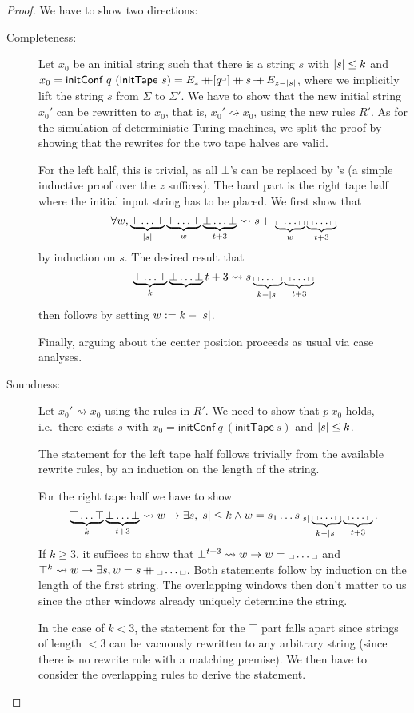 \documentclass[a4paper,UKenglish,cleveref, autoref]{lipics-v2019}
\newcommand{\strent}{\rightsquigarrow}
\begin{document}
\begin{proof}
  We have to show two directions:
  \begin{description}
  	\item[Completeness:]
      Let $x_0$ be an initial string such that there is a string $s$ with $|s| \le k$ and $x_0 = \textsf{initConf}~q~(\textsf{initTape}~s) = E_z \concat [q^\blank] \concat s \concat E_{z - \length{s}}$, where we implicitly lift the string $s$ from $\Sigma$ to $\Sigma'$. We have to show that the new initial string $x_0'$ can be rewritten to $x_0$, that is, $x_0' \strent{} x_0$, using the new rules $R'$. As for the simulation of deterministic Turing machines, we split the proof by showing that the rewrites for the two tape halves are valid.

      For the left half, this is trivial, as all $\bot$'s can be replaced by \blank's (a simple inductive proof over the $z$ suffices). The hard part is the right tape half where the initial input string has to be placed.
      We first show that 
      \[ \forall w, \underbrace{\top \ldots \top}_{\length{s}} \underbrace{\top \ldots \top}_{w} \underbrace{\bot \ldots \bot}_{t + 3} \strent{} s \concat \underbrace{\blank \ldots \blank}_{w} \underbrace{\blank \ldots \blank}_{t+3} \]
      by induction on $s$. The desired result that 
      \[\underbrace{\top \ldots \top}_{k} \underbrace{\bot \ldots \bot}{t+3} \strent{} s \underbrace{\blank \ldots \blank}_{k-\length{s}} \underbrace{\blank \ldots \blank}_{t+3} \]
      then follows by setting $w := k - |s|$. 

      Finally, arguing about the center position proceeds as usual via case analyses.

  	\item[Soundness:]
      Let $x_0' \strent{} x_0$ using the rules in $R'$. We need to show that $p~x_0$ holds, i.e.\ there exists $s$ with $x_0 = \textsf{initConf}~q~(\textsf{initTape}~s)$ and $|s| \le k$. 
      
      The statement for the left tape half follows trivially from the available rewrite rules, by an induction on the length of the string. 

      For the right tape half we have to show
      \[\underbrace{\top \ldots \top}_{k} \underbrace{\bot \ldots \bot}_{t + 3} \strent{} w \rightarrow \exists s, \length{s} \le k \land w = s_1 \ldots s_{\length{s}} \underbrace{\blank \ldots \blank}_{k-\length{s}} \underbrace{\blank \ldots \blank}_{t + 3}. \]
      If $k \ge 3$, it suffices to show that ${\bot}^{t+3} \strent{} w \rightarrow w = \blank \ldots \blank$ and ${\top}^k \strent{} w \rightarrow \exists s, w = s \concat \blank \ldots \blank$. Both statements follow by induction on the length of the first string. The overlapping windows then don't matter to us since the other windows already uniquely determine the string. 

      In the case of $k < 3$, the statement for the $\top$ part falls apart since strings of length $< 3$ can be vacuously rewritten to any arbitrary string (since there is no rewrite rule with a matching premise). We then have to consider the overlapping rules to derive the statement.
  \end{description}
\end{proof}
\end{document}
